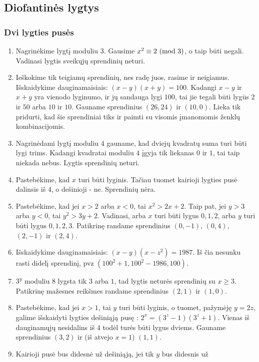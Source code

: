 \subsection*{Diofantinės lygtys}
\subsubsection*{Dvi lygties pusės}
\begin{enumerate} 
\item 
Nagrinėkime lygtį moduliu $3$. Gausime $x^2 \equiv 2 \ (\text{mod } 3)$, o taip
būti negali. Vadinasi lygtis sveikųjų sprendinių neturi.
\item 
Ieškokime tik teigiamų sprendinių, nes radę juos, rasime ir neigiamus.
Išskaidykime dauginamaisiais: $(x-y)(x+y)=100$. Kadangi $x-y$ ir $x+y$
yra vienodo lyginumo, ir jų sandauga lygi $100$, tai jie tegali būti
lygūs $2$ ir $50$ arba $10$ ir $10$. Gauname sprendinius $(26,24)$ ir 
$(10,0)$. Lieka tik pridurti, kad šie sprendiniai tiks ir paimti su
visomis įmanomomis ženklų kombinacijomis.
\item 
Nagrinėdami lygtį moduliu $4$ gauname, kad dviejų kvadratų suma turi
būti lygi trims. Kadangi kvadratai moduliu $4$ įgyja tik liekanas
$0$ ir $1$, tai taip niekada nebus. Lygtis sprendinių neturi.
\item 
Pastebėkime, kad $x$ turi būti lyginis. Tačiau tuomet kairioji lygties
pusė dalinsis iš $4$, o dešinioji - ne. Sprendinių nėra.
\item 
Pastebėkime, kad jei $x>2$ arba $x<0$, tai $x^2> 2x + 2$. Taip pat,
jei $y>3$ arba $y<0$, tai $y^2 > 3y + 2$. Vadinasi, arba $x$ turi būti
lygus $0, 1, 2$, arba $y$ turi būti lygus $0, 1, 2, 3$. Patikrinę
randame sprendinius $(0,-1)$, $(0,4)$, $(2, -1)$ ir $(2, 4)$.
\item 
Išskaidykime dauginamaisiais: $(x-y)(x-z^2) = 1987.$ Iš čia nesunku
rasti didelį sprendinį, pvz $(100^2 + 1,100^2 - 1986, 100)$.	
\item 
$3^y$ moduliu $8$ lygsta tik $3$ arba $1$, tad lygtis neturės
sprendinių su $x\geq 3$. Patikrinę mažesnes reikšmes randame
sprendinius $(2,1)$ ir $(1,0)$.
\item 
Pastebėkime, kad jei $x>1$, tai $y$ turi būti lyginis, o tuomet,
pažymėję $y=2z$, galime išskaidyti lygties dešiniąją pusę : $2^x =
(3^z - 1)(3^z + 1)$. Vienas iš dauginamųjų nesidalins iš $4$ todėl
turės būti lygus dviems. Gauname sprendinius $(3,2)$ ir (iš atvejo
$x=1$) $(1,1)$.
\item 
Kairioji pusė bus didesnė už dešiniąją, jei tik $y$ bus didesnis už

\end{enumerate}
